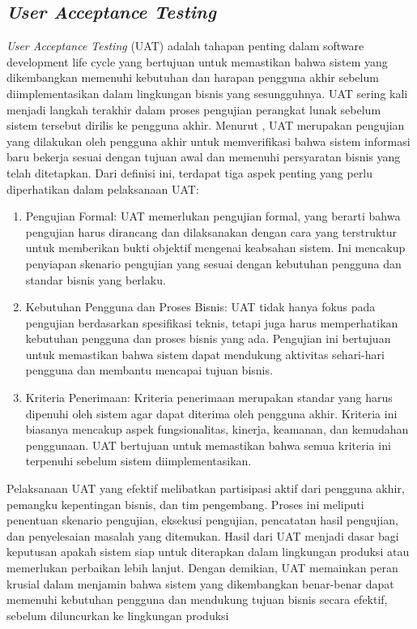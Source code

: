 \subsection{\textit{User Acceptance Testing}}
\textit{User Acceptance Testing} (UAT) adalah tahapan penting dalam software development life cycle yang bertujuan untuk memastikan bahwa sistem yang dikembangkan memenuhi kebutuhan dan harapan pengguna akhir sebelum diimplementasikan dalam lingkungan bisnis yang sesungguhnya. UAT sering kali menjadi langkah terakhir dalam proses pengujian perangkat lunak sebelum sistem tersebut dirilis ke pengguna akhir.
\singlespacing{}
Menurut \citet{hambling2013user}, UAT merupakan pengujian yang dilakukan oleh pengguna akhir untuk memverifikasi bahwa sistem informasi baru bekerja sesuai dengan tujuan awal dan memenuhi persyaratan bisnis yang telah ditetapkan.
Dari definisi ini, terdapat tiga aspek penting yang perlu diperhatikan dalam pelaksanaan UAT:\@
\begin{enumerate}
  \item Pengujian Formal: UAT memerlukan pengujian formal, yang berarti bahwa pengujian harus dirancang dan dilaksanakan dengan cara yang terstruktur untuk memberikan bukti objektif mengenai keabsahan sistem. Ini mencakup penyiapan skenario pengujian yang sesuai dengan kebutuhan pengguna dan standar bisnis yang berlaku.
  \item Kebutuhan Pengguna dan Proses Bisnis: UAT tidak hanya fokus pada pengujian berdasarkan spesifikasi teknis, tetapi juga harus memperhatikan kebutuhan pengguna dan proses bisnis yang ada. Pengujian ini bertujuan untuk memastikan bahwa sistem dapat mendukung aktivitas sehari-hari pengguna dan membantu mencapai tujuan bisnis.
  \item Kriteria Penerimaan: Kriteria penerimaan merupakan standar yang harus dipenuhi oleh sistem agar dapat diterima oleh pengguna akhir. Kriteria ini biasanya mencakup aspek fungsionalitas, kinerja, keamanan, dan kemudahan penggunaan. UAT bertujuan untuk memastikan bahwa semua kriteria ini terpenuhi sebelum sistem diimplementasikan.
\end{enumerate}
\singlespacing{}
Pelaksanaan UAT yang efektif melibatkan partisipasi aktif dari pengguna akhir, pemangku kepentingan bisnis, dan tim pengembang. Proses ini meliputi penentuan skenario pengujian, eksekusi pengujian, pencatatan hasil pengujian, dan penyelesaian masalah yang ditemukan. Hasil dari UAT menjadi dasar bagi keputusan apakah sistem siap untuk diterapkan dalam lingkungan produksi atau memerlukan perbaikan lebih lanjut. Dengan demikian, UAT memainkan peran krusial dalam menjamin bahwa sistem yang dikembangkan benar-benar dapat memenuhi kebutuhan pengguna dan mendukung tujuan bisnis secara efektif, sebelum diluncurkan ke lingkungan produksi \citep{hambling2013user}